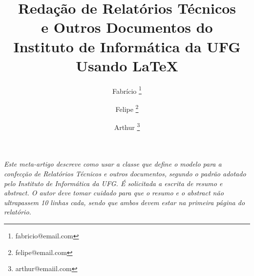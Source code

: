 \documentclass[a4paper, 12pt]{article}
\makeatletter
\newenvironment{resumo}{%
  \list{}{%
    \leftmargin=0.8cm
    \labelwidth=\z@
    \listparindent=\z@
    \itemindent\listparindent
    \rightmargin\leftmargin}\item[\hskip\labelsep
  \bfseries\itshape Resumo.]\itshape}%
{\endlist}
\makeatother
\begin{document}
%
\title{\bf Redação de Relatórios Técnicos \\e Outros Documentos do
  \\ Instituto de Informática da UFG Usando \LaTeX}

\author{Fabrício \thanks{fabricio@email.com} \and
  Felipe \thanks{felipe@email.com} \and
  Arthur \thanks{arthur@emaiil.com}}
\date{}

\maketitle






\begin{resumo} 
Este meta-artigo descreve como usar a classe que define o modelo para a confecção de Relatórios Técnicos e outros documentos, segundo o padrão adotado pelo Instituto de Informática da UFG. É solicitada a escrita de resumo e \textit{abstract}. O autor deve tomar cuidado para que o resumo e o \textit{abstract} não ultrapassem 10 linhas cada, sendo que ambos devem estar na primeira página do relatório.
\end{resumo}
\end{document}
